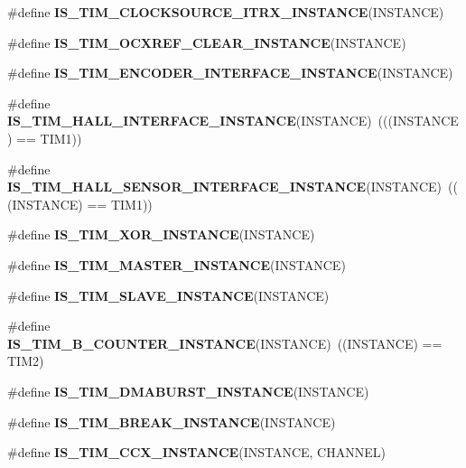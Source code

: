 \begin{DoxyCompactItemize}
\item 
\#define {\bfseries I\+S\+\_\+\+T\+I\+M\+\_\+\+C\+L\+O\+C\+K\+S\+O\+U\+R\+C\+E\+\_\+\+I\+T\+R\+X\+\_\+\+I\+N\+S\+T\+A\+N\+CE}(I\+N\+S\+T\+A\+N\+CE)
\item 
\#define {\bfseries I\+S\+\_\+\+T\+I\+M\+\_\+\+O\+C\+X\+R\+E\+F\+\_\+\+C\+L\+E\+A\+R\+\_\+\+I\+N\+S\+T\+A\+N\+CE}(I\+N\+S\+T\+A\+N\+CE)
\item 
\#define {\bfseries I\+S\+\_\+\+T\+I\+M\+\_\+\+E\+N\+C\+O\+D\+E\+R\+\_\+\+I\+N\+T\+E\+R\+F\+A\+C\+E\+\_\+\+I\+N\+S\+T\+A\+N\+CE}(I\+N\+S\+T\+A\+N\+CE)
\item 
\mbox{\label{group___exported__macro_gacdcc047699e2d83c9d2b3a3f8375dff4}} 
\#define {\bfseries I\+S\+\_\+\+T\+I\+M\+\_\+\+H\+A\+L\+L\+\_\+\+I\+N\+T\+E\+R\+F\+A\+C\+E\+\_\+\+I\+N\+S\+T\+A\+N\+CE}(I\+N\+S\+T\+A\+N\+CE)~(((I\+N\+S\+T\+A\+N\+CE) == T\+I\+M1))
\item 
\mbox{\label{group___exported__macro_ga979ea18ba0931f5ed15cc2f3ac84794b}} 
\#define {\bfseries I\+S\+\_\+\+T\+I\+M\+\_\+\+H\+A\+L\+L\+\_\+\+S\+E\+N\+S\+O\+R\+\_\+\+I\+N\+T\+E\+R\+F\+A\+C\+E\+\_\+\+I\+N\+S\+T\+A\+N\+CE}(I\+N\+S\+T\+A\+N\+CE)~(((I\+N\+S\+T\+A\+N\+CE) == T\+I\+M1))
\item 
\#define {\bfseries I\+S\+\_\+\+T\+I\+M\+\_\+\+X\+O\+R\+\_\+\+I\+N\+S\+T\+A\+N\+CE}(I\+N\+S\+T\+A\+N\+CE)
\item 
\#define {\bfseries I\+S\+\_\+\+T\+I\+M\+\_\+\+M\+A\+S\+T\+E\+R\+\_\+\+I\+N\+S\+T\+A\+N\+CE}(I\+N\+S\+T\+A\+N\+CE)
\item 
\#define {\bfseries I\+S\+\_\+\+T\+I\+M\+\_\+\+S\+L\+A\+V\+E\+\_\+\+I\+N\+S\+T\+A\+N\+CE}(I\+N\+S\+T\+A\+N\+CE)
\item 
\mbox{\label{group___exported__macro_gac41867bf288927ff8ff10a85e67a591b}} 
\#define {\bfseries I\+S\+\_\+\+T\+I\+M\+\_\+B\+\_\+\+C\+O\+U\+N\+T\+E\+R\+\_\+\+I\+N\+S\+T\+A\+N\+CE}(I\+N\+S\+T\+A\+N\+CE)~((I\+N\+S\+T\+A\+N\+CE) == T\+I\+M2)
\item 
\#define {\bfseries I\+S\+\_\+\+T\+I\+M\+\_\+\+D\+M\+A\+B\+U\+R\+S\+T\+\_\+\+I\+N\+S\+T\+A\+N\+CE}(I\+N\+S\+T\+A\+N\+CE)
\item 
\#define {\bfseries I\+S\+\_\+\+T\+I\+M\+\_\+\+B\+R\+E\+A\+K\+\_\+\+I\+N\+S\+T\+A\+N\+CE}(I\+N\+S\+T\+A\+N\+CE)
\item 
\#define {\bfseries I\+S\+\_\+\+T\+I\+M\+\_\+\+C\+C\+X\+\_\+\+I\+N\+S\+T\+A\+N\+CE}(I\+N\+S\+T\+A\+N\+CE,  C\+H\+A\+N\+N\+EL)

\end{DoxyCompactItemize}
